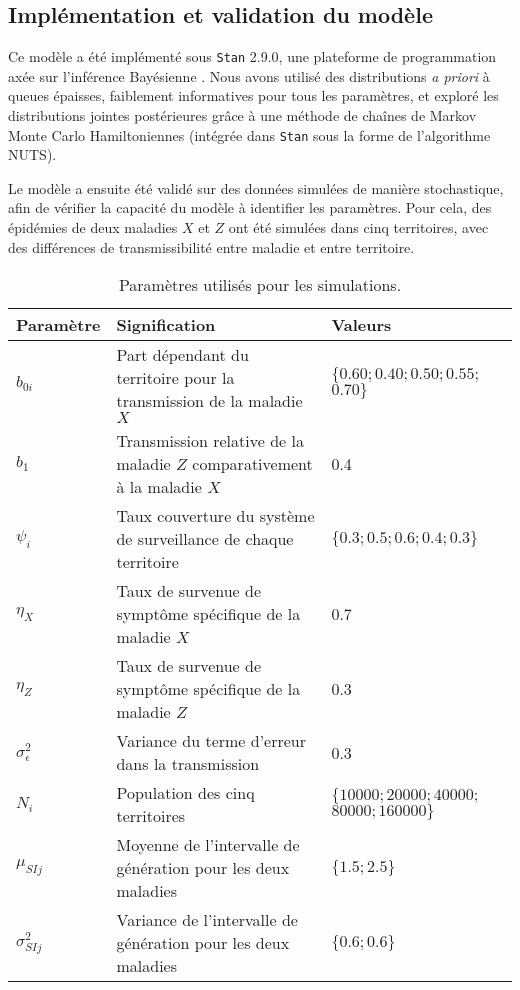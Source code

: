 \subsection{Implémentation et validation du modèle}

Ce modèle a été implémenté sous \texttt{Stan} 2.9.0, une plateforme de programmation axée sur l'inférence Bayésienne \cite{carpenter2015stan}.
Nous avons utilisé des distributions {\em a priori} à queues épaisses, faiblement informatives pour tous les paramètres, et exploré les distributions jointes postérieures grâce à une méthode de chaînes de Markov Monte Carlo Hamiltoniennes (intégrée dans  \texttt{Stan} sous la forme de l'algorithme NUTS).

Le modèle a ensuite été validé sur des données simulées de manière stochastique, afin de vérifier la capacité du modèle à identifier les paramètres.
Pour cela, des épidémies de deux maladies $X$ et $Z$ ont été simulées dans cinq territoires, avec des différences de transmissibilité entre maladie et entre territoire.
\begin{table}[h]
\centering
\caption{Paramètres utilisés pour les simulations. \vspace{.5em}}
\label{table:simpar}
\begin{tabular}{L{2cm}L{7cm}L{4cm}}
\hline
Paramètre & Signification & Valeurs \\
\hline
$b_{0i}$ & Part dépendant du territoire pour la transmission de la maladie $X$ & $\{0.60; 0.40;0.50;0.55;$ $0.70\}$ \\
$b_1$ & Transmission relative de la maladie $Z$ comparativement à la maladie $X$ & 0.4 \\
$\psi_i$ &  Taux couverture du système de surveillance de chaque territoire & $\{0.3; 0.5; 0.6; 0.4; 0.3\}$ \\
$\eta_X$ & Taux de survenue de symptôme spécifique de la maladie $X$ & 0.7 \\
$\eta_Z$ & Taux de survenue de symptôme spécifique de la maladie $Z$ & 0.3 \\
$\sigma_{\epsilon}^2$ & Variance du terme d'erreur dans la transmission & 0.3 \\
$N_i$ & Population des cinq territoires & $\{10000; 20000; 40000;$ $80000; 160000\}$ \\
$\mu_{SIj}$ & Moyenne de l'intervalle de génération pour les deux maladies & $\{1.5; 2.5\}$ \\
$\sigma_{SIj}^2$ & Variance de l'intervalle de génération pour les deux maladies & $\{0.6; 0.6\}$ \\
\hline
\end{tabular}
\end{table}
